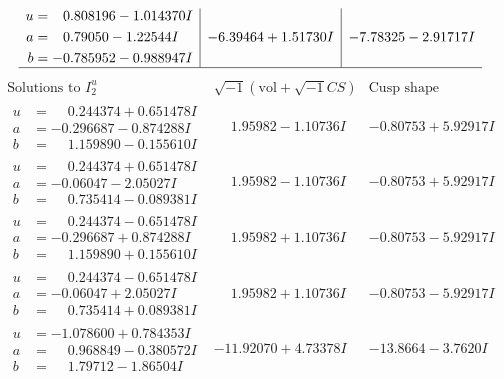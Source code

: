 \documentclass[1p]{elsarticle_modified}
\theoremstyle{definition}
\newcommand{\I}{\sqrt{-1}}
\begin{document}
$$\begin{array}{c|c|c}
\begin{aligned}
u &= \phantom{-}0.808196 - 1.014370 I \\
a &= \phantom{-}0.79050 - 1.22544 I \\
b &= -0.785952 - 0.988947 I\end{aligned}
 & -6.39464 + 1.51730 I & -7.78325 - 2.91717 I\\
 \hline 
 \end{array}$$\newpage$$\begin{array}{c|c|c}  
\text{Solutions to }I^u_{2}& \I (\text{vol} + \sqrt{-1}CS) & \text{Cusp shape}\\
 \hline 
\begin{aligned}
u &= \phantom{-}0.244374 + 0.651478 I \\
a &= -0.296687 - 0.874288 I \\
b &= \phantom{-}1.159890 - 0.155610 I\end{aligned}
 & \phantom{-}1.95982 - 1.10736 I & -0.80753 + 5.92917 I \\ \hline\begin{aligned}
u &= \phantom{-}0.244374 + 0.651478 I \\
a &= -0.06047 - 2.05027 I \\
b &= \phantom{-}0.735414 - 0.089381 I\end{aligned}
 & \phantom{-}1.95982 - 1.10736 I & -0.80753 + 5.92917 I \\ \hline\begin{aligned}
u &= \phantom{-}0.244374 - 0.651478 I \\
a &= -0.296687 + 0.874288 I \\
b &= \phantom{-}1.159890 + 0.155610 I\end{aligned}
 & \phantom{-}1.95982 + 1.10736 I & -0.80753 - 5.92917 I \\ \hline\begin{aligned}
u &= \phantom{-}0.244374 - 0.651478 I \\
a &= -0.06047 + 2.05027 I \\
b &= \phantom{-}0.735414 + 0.089381 I\end{aligned}
 & \phantom{-}1.95982 + 1.10736 I & -0.80753 - 5.92917 I \\ \hline\begin{aligned}
u &= -1.078600 + 0.784353 I \\
a &= \phantom{-}0.968849 - 0.380572 I \\
b &= \phantom{-}1.79712 - 1.86504 I\end{aligned}
 & -11.92070 + 4.73378 I & -13.8664 - 3.7620 I \\ \hline\begin{aligned}

\end{aligned}
\end{array}$$
\end{document}
